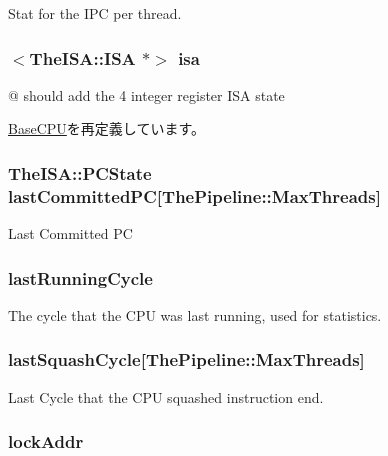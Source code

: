 \label{classInOrderCPU_a6f168a31ee4084b6167d6761a4124014}
Stat for the IPC per thread. \hypertarget{classInOrderCPU_aa0d8dc5e214b94342d1f730e4e34ae82}{
\subsubsection[{isa}]{$<$TheISA::ISA $\ast$$>$ {\bf isa}}}
\label{classInOrderCPU_aa0d8dc5e214b94342d1f730e4e34ae82}
@ should add the 4 integer register ISA state 

\hyperlink{classBaseCPU_a6d1804c8bb7cb5ff7f700541100052c4}{BaseCPU}を再定義しています。\hypertarget{classInOrderCPU_a2a4351147bb2df83bee5c60edc50165f}{
\subsubsection[{lastCommittedPC}]{\setlength{\rightskip}{0pt plus 5cm}TheISA::PCState {\bf lastCommittedPC}\mbox{[}{\bf ThePipeline::MaxThreads}\mbox{]}}}
\label{classInOrderCPU_a2a4351147bb2df83bee5c60edc50165f}
Last Committed PC \hypertarget{classInOrderCPU_a55a1507086425a12c25953d6061af80c}{
\subsubsection[{lastRunningCycle}]{ {\bf lastRunningCycle}}}
\label{classInOrderCPU_a55a1507086425a12c25953d6061af80c}
The cycle that the CPU was last running, used for statistics. \hypertarget{classInOrderCPU_a07ac7fa00a59be2904eaa76d4735681e}{
\subsubsection[{lastSquashCycle}]{ {\bf lastSquashCycle}\mbox{[}{\bf ThePipeline::MaxThreads}\mbox{]}}}
\label{classInOrderCPU_a07ac7fa00a59be2904eaa76d4735681e}
Last Cycle that the CPU squashed instruction end. \hypertarget{classInOrderCPU_a6ef203de76af61b4babb98f152867401}{
\subsubsection[{lockAddr}]{ {\bf lockAddr}}}
